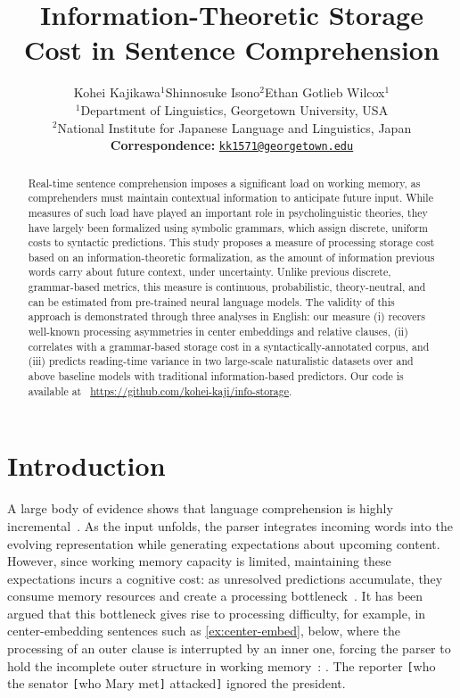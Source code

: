 \documentclass[11pt]{article}
\title{Information-Theoretic Storage Cost in Sentence Comprehension}
\author{
    Kohei Kajikawa${}^1$\quad Shinnosuke Isono${}^2$\quad Ethan Gotlieb Wilcox${}^1$ \\
    ${}^1$Department of Linguistics, Georgetown University, USA \\
    ${}^2$National Institute for Japanese Language and Linguistics, Japan \\
    \small{
        \textbf{Correspondence:} \href{mailto:kk1571@georgetown.edu}{\texttt{kk1571@georgetown.edu}}
    }
  }
\begin{document}
\maketitle

\begin{abstract}

Real-time sentence comprehension imposes a significant load on working memory, as comprehenders must maintain contextual information to anticipate future input. While measures of such load have played an important role in psycholinguistic theories, they have largely been formalized using symbolic grammars, which assign discrete, uniform costs to syntactic predictions. This study proposes a measure of processing storage cost based on an information-theoretic formalization, as the amount of information previous words carry about future context, under uncertainty. Unlike previous discrete, grammar-based metrics, this measure is continuous, probabilistic, theory-neutral, and can be estimated from pre-trained neural language models. The validity of this approach is demonstrated through three analyses in English: our measure (i) recovers well-known processing asymmetries in center embeddings and relative clauses, (ii) correlates with a grammar-based storage cost in a syntactically-annotated corpus, and (iii) predicts reading-time variance in two large-scale naturalistic datasets over and above baseline models with traditional information-based predictors.
Our code is available at \faGithub~\url{https://github.com/kohei-kaji/info-storage}.

\end{abstract}



\section{Introduction}
\label{sec:intro}


A large body of evidence shows that language comprehension is highly incremental~\citep{marslen-wilson-1973,tanenhaus-etal-1995,kamide-etal-2003}.
As the input unfolds, the parser integrates incoming words into the evolving representation while generating expectations about upcoming content.
However, since working memory capacity is limited, maintaining these expectations incurs a cognitive cost:
as unresolved predictions accumulate, they consume memory resources and create a processing bottleneck~\citep{just-carpenter-1992}.
It has been argued that this bottleneck gives rise to processing difficulty, for example, in center-embedding sentences such as \ref{ex:center-embed}, below, where the processing of an outer clause is interrupted by an inner one, forcing the parser to hold the incomplete outer structure in working memory~\citep{yngve-1960,miller-chomsky-1963,gibson-1998}:
%
\ex. The reporter \texttt{[}who the senator \texttt{[}who Mary met\texttt{]} attacked\texttt{]} ignored the president. \label{ex:center-embed}
\end{document}
